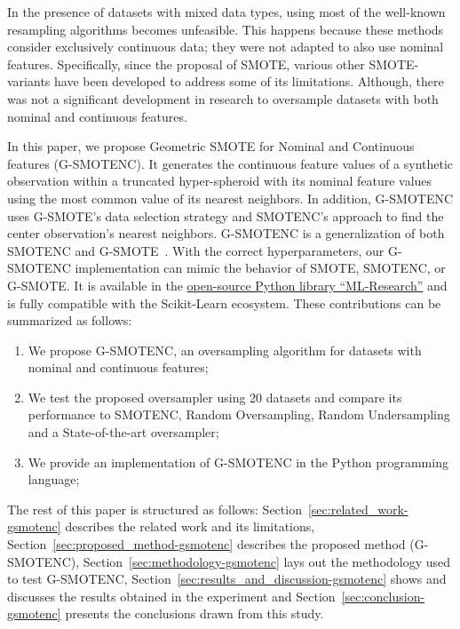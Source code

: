 In the presence of datasets with mixed data types, using most of the
well-known resampling algorithms becomes unfeasible. This happens because
these methods consider exclusively continuous data; they were not adapted to
also use nominal features. Specifically, since the proposal of SMOTE, various
other SMOTE-variants have been developed to address some of its limitations.
Although, there was not a significant development in research to oversample
datasets with both nominal and continuous features. 

In this paper, we propose Geometric SMOTE for Nominal and Continuous features
(G-SMOTENC). It generates the continuous feature values of a synthetic
observation within a truncated hyper-spheroid with its nominal feature values
using the most common value of its nearest neighbors. In addition, G-SMOTENC
uses G-SMOTE's data selection strategy and SMOTENC's approach to find the
center observation's nearest neighbors. G-SMOTENC is a generalization of both
SMOTENC and G-SMOTE~\cite{Douzas2019}. With the correct
hyperparameters, our G-SMOTENC implementation can mimic the behavior of SMOTE,
SMOTENC, or G-SMOTE\@. It is available in the
\href{https://github.com/joaopfonseca/ml-research}{open-source Python library
``ML-Research''} and is fully compatible with the Scikit-Learn ecosystem.
These contributions can be summarized as follows:

\begin{enumerate}
    \item We propose G-SMOTENC, an oversampling algorithm for datasets with
        nominal and continuous features;
    \item We test the proposed oversampler using 20 datasets and compare its
        performance to SMOTENC, Random Oversampling, Random Undersampling and
        a State-of-the-art oversampler;
    \item We provide an implementation of G-SMOTENC in the Python programming
        language;
\end{enumerate}

The rest of this paper is structured as follows:
Section~\ref{sec:related_work-gsmotenc} describes the related work and its limitations,
Section~\ref{sec:proposed_method-gsmotenc} describes the proposed
method (G-SMOTENC), Section~\ref{sec:methodology-gsmotenc} lays out the methodology
used to test G-SMOTENC, Section~\ref{sec:results_and_discussion-gsmotenc} shows and
discusses the results obtained in the experiment and
Section~\ref{sec:conclusion-gsmotenc} presents the conclusions drawn from this study.


